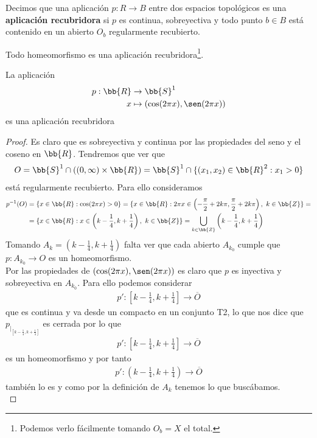 \begin{definicion}
    Decimos que una aplicación $p:R \to B$ entre dos espacios topológicos es una \textbf{aplicación recubridora} si $p$ es continua, sobreyectiva y todo punto $b \in B$ está contenido en un abierto $O_b$ regularmente recubierto.
\end{definicion}

\begin{observacion}
    Todo homeomorfismo es una aplicación recubridora\footnote{Podemos verlo fácilmente tomando $O_b = X$ el total.}. 
\end{observacion}

\begin{teo}
    La aplicación
    \begin{align*}
        p:\bb{R} & \to \bb{S}^1\\
        x & \mapsto (\cos(2\pi x), \sen (2\pi x))
    \end{align*}
    es una aplicación recubridora
    \begin{proof}
        Es claro que es sobreyectiva y continua por las propiedades del seno y el coseno en $\bb{R}$. Tendremos que ver que 
        \begin{gather*}
            O=\bb{S}^1\cap ((0,\infty)\times \bb{R}) = \bb{S}^1 \cap \{(x_1,x_2)\in \bb{R}^2 : x_1>0\}
        \end{gather*}
        está regularmente recubierto. Para ello consideramos
        \begin{align*}
            p^{-1}(O) &= \{x\in \bb{R}: \cos(2\pi x) > 0\} = \{x\in \bb{R} : 2\pi x \in \left(-\frac{\pi}{2} + 2k\pi, \frac{\pi}{2} +2k\pi\right),\ k\in \bb{Z}\} =\\
            &=\{x\in \bb{R} : x \in \left(k-\frac{1}{4}, k+\frac{1}{4}\right),\ k\in \bb{Z}\} = \bigcup\limits_{k\in \bb{Z}}\left(k-\frac{1}{4}, k+\frac{1}{4}\right)
        \end{align*}
        Tomando $A_k = \left(k-\frac{1}{4}, k+\frac{1}{4}\right)$ falta ver que cada abierto $A_{k_0}$ cumple que $p:A_{k_0} \to O$ es un homeomorfismo.\\

        Por las propiedades de $(\cos(2\pi x), \sen(2\pi x))$ es claro que $p$ es inyectiva y sobreyectiva en $A_{k_0}$. Para ello podemos considerar 
        \begin{align*}
            p':\left[k-\frac{1}{4}, k+\frac{1}{4}\right] \to \overline{O}
        \end{align*}
        que es continua y va desde un compacto en un conjunto T2, lo que nos dice que $p_{|_{\left[k-\frac{1}{4}, k+\frac{1}{4}\right]}}$ es cerrada por lo que
        \begin{gather*}
            p':\left[k-\frac{1}{4}, k+\frac{1}{4}\right] \to \overline{O}
        \end{gather*}
        es un homeomorfismo y por tanto
        \begin{gather*}
            p':\left(k-\frac{1}{4}, k+\frac{1}{4}\right) \to \overline{O}
        \end{gather*}
        también lo es y como por la definición de $A_k$ tenemos lo que buscábamos. \\


\end{proof}
\end{teo}
